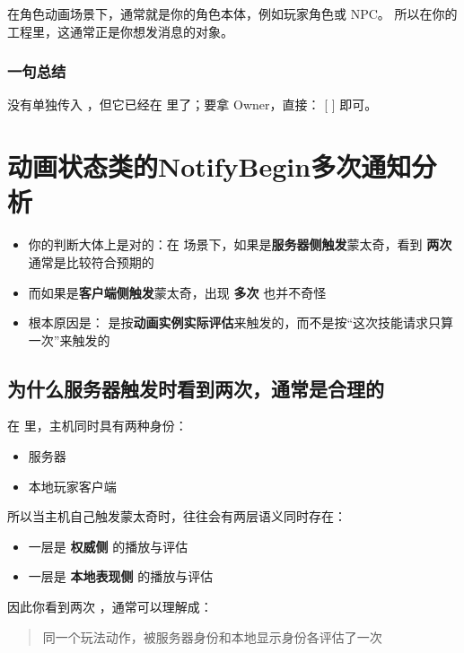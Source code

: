 在角色动画场景下，通常就是你的角色本体，例如玩家角色或 NPC。
所以在你的工程里，这通常正是你想发消息的对象。
\subsubsection{一句总结}
 没有单独传入 ，但它已经在  里了；要拿 Owner，直接：
[  ]
即可。

\section{动画状态类的NotifyBegin多次通知分析}

\begin{itemize}
	\item 你的判断大体上是对的：在  场景下，如果是\textbf{服务器侧触发}蒙太奇，看到 \textbf{两次} 通常是比较符合预期的
	\item 而如果是\textbf{客户端侧触发}蒙太奇，出现 \textbf{多次} 也并不奇怪
	\item 根本原因是： 是按\textbf{动画实例实际评估}来触发的，而不是按“这次技能请求只算一次”来触发的
\end{itemize}

\subsection{为什么服务器触发时看到两次，通常是合理的}

在  里，主机同时具有两种身份：

\begin{itemize}
	\item 服务器
	\item 本地玩家客户端
\end{itemize}

所以当主机自己触发蒙太奇时，往往会有两层语义同时存在：

\begin{itemize}
	\item 一层是 \textbf{权威侧} 的播放与评估
	\item 一层是 \textbf{本地表现侧} 的播放与评估
\end{itemize}

因此你看到两次 ，通常可以理解成：

\begin{quote}
	同一个玩法动作，被服务器身份和本地显示身份各评估了一次
\end{quote}

